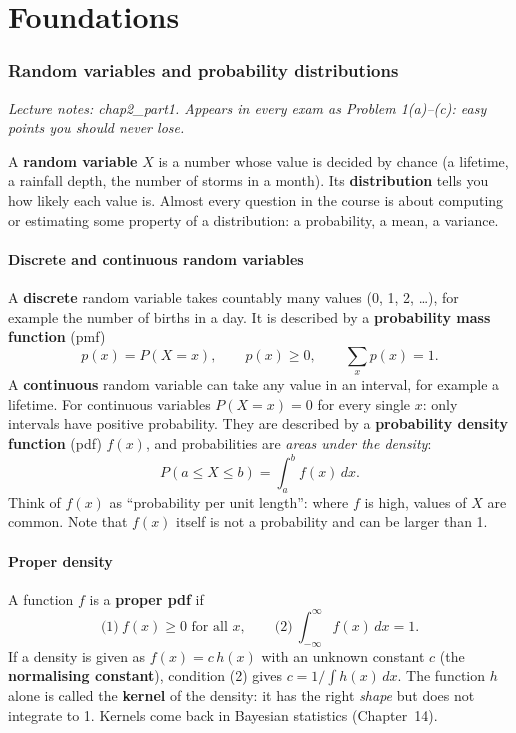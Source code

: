 \part{Foundations}

\section{Random variables and probability distributions}
\textit{Lecture notes: chap2\_part1. Appears in every exam as Problem 1(a)--(c): easy points you should never lose.}

\begin{idea}
A \textbf{random variable} $X$ is a number whose value is decided by chance (a lifetime, a rainfall depth, the number of storms in a month). Its \textbf{distribution} tells you how likely each value is. Almost every question in the course is about computing or estimating some property of a distribution: a probability, a mean, a variance.
\end{idea}

\subsection{Discrete and continuous random variables}
A \textbf{discrete} random variable takes countably many values (0, 1, 2, \ldots), for example the number of births in a day. It is described by a \textbf{probability mass function} (pmf)
\[
p(x) = P(X = x), \qquad p(x)\ge 0,\qquad \sum_x p(x) = 1 .
\]
A \textbf{continuous} random variable can take any value in an interval, for example a lifetime. For continuous variables $P(X = x) = 0$ for every single $x$: only intervals have positive probability. They are described by a \textbf{probability density function} (pdf) $f(x)$, and probabilities are \emph{areas under the density}:
\[
P(a \le X \le b) = \int_a^b f(x)\,dx .
\]
Think of $f(x)$ as ``probability per unit length'': where $f$ is high, values of $X$ are common. Note that $f(x)$ itself is not a probability and can be larger than 1.

\subsection{Proper density}
A function $f$ is a \textbf{proper pdf} if
\[
\text{(1)}\ f(x) \ge 0 \text{ for all } x, \qquad \text{(2)}\ \int_{-\infty}^{\infty} f(x)\,dx = 1 .
\]
If a density is given as $f(x) = c\,h(x)$ with an unknown constant $c$ (the \textbf{normalising constant}), condition (2) gives $c = 1/\int h(x)\,dx$. The function $h$ alone is called the \textbf{kernel} of the density: it has the right \emph{shape} but does not integrate to 1. Kernels come back in Bayesian statistics (Chapter~14).

